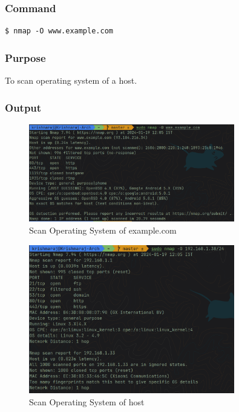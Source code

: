 \documentclass[11pt]{article}
\begin{document}
\subsubsection*{Command}
\begin{verbatim}
$ nmap -O www.example.com
\end{verbatim}

\subsubsection*{Purpose}
To scan operating system of a host.

\subsubsection*{Output}
\begin{figure}[H]
    \centering
    \includegraphics[width=0.8\textwidth]{nmap example os.png}
    \caption{Scan Operating System of example.com}
    \label{fig:1}
\end{figure}

\begin{figure}[H]
    \centering
    \includegraphics[width=0.8\textwidth]{nmap os host.png}
    \caption{Scan Operating System of host}
    \label{fig:1}
\end{figure}
\end{document}
